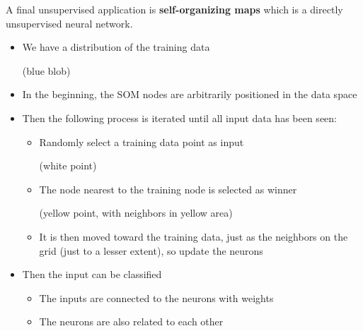A final unsupervised application is \textbf{self-organizing maps} which is a directly unsupervised neural network.
\begin{itemize}
  \item We have a distribution of the training data \begin{note}(blue blob)\end{note}
  \item In the beginning, the SOM nodes are arbitrarily positioned in the data space
  \item Then the following process is iterated until all input data has been seen:
  \begin{itemize}
    \item Randomly select a training data point as input \begin{note}(white point)\end{note}
    \item The node nearest to the training node is selected as winner \begin{note}(yellow point, with neighbors in yellow area)\end{note}
    \item It is then moved toward the training data, just as the neighbors on the grid (just to a lesser extent), so update the neurons
  \end{itemize}
  \item Then the input can be classified
  \begin{itemize}
    \item The inputs are connected to the neurons with weights
    \item The neurons are also related to each other
  \end{itemize}
\end{itemize}

